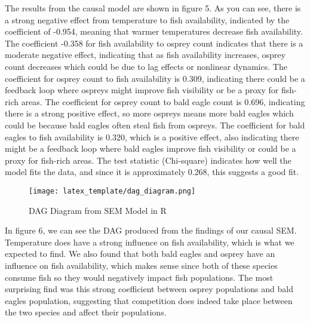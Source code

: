 \documentclass{article}
\begin{document}
The results from the causal model are shown in figure 5. As you can see, there is a strong negative effect from temperature to fish availability, indicated by the coefficient of -0.954, meaning that warmer temperatures decrease fish availability. The coefficient -0.358 for fish availability to osprey count indicates that there is a moderate negative effect, indicating that as fish availability increases, osprey count decreases which could be due to lag effects or nonlinear dynamics. The coefficient for osprey count to fish availability is 0.309, indicating there could be a feedback loop where ospreys might improve fish visibility or be a proxy for fish-rich areas. The coefficient for osprey count to bald eagle count is 0.696, indicating there is a strong positive effect, so more ospreys means more bald eagles which could be because bald eagles often steal fish from ospreys. The coefficient for bald eagles to fish availability is 0.320, which is a positive effect, also indicating there might be a feedback loop where bald eagles improve fish visibility or could be a proxy for fish-rich areas. The test statistic (Chi-square) indicates how well the model fits the data, and since it is approximately 0.268, this suggests a good fit. 

\begin{figure}[htbp]
\centerline{\texttt{[image: latex\_template/dag\_diagram.png]}}
\caption{DAG Diagram from SEM Model in R}
\label{fig}
\end{figure}

In figure 6, we can see the DAG produced from the findings of our causal SEM. Temperature does have a strong influence on fish availability, which is what we expected to find. We also found that both bald eagles and osprey have an influence on fish availability, which makes sense since both of these species consume fish so they would negatively impact fish populations. The most surprising find was this strong coefficient between osprey populations and bald eagles population, suggesting that competition does indeed take place between the two species and affect their populations. 
\end{document}
